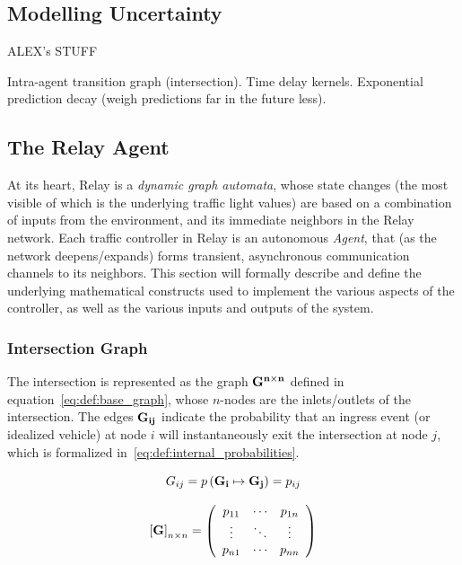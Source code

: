 \documentclass{report}
\begin{document}
\subsection{Modelling Uncertainty}
\label{sec:modelling_uncertainty}

ALEX's STUFF

Intra-agent transition graph (intersection).
Time delay kernels.
Exponential prediction decay (weigh predictions far in the future less).


\subsection{The Relay Agent}
\label{sec:def:agent}

At its heart, Relay is a \emph{dynamic graph automata}, whose state changes (the most visible of which is the underlying traffic light values) are based on a combination of inputs from the environment, and its immediate neighbors in the Relay network.
Each traffic controller in Relay is an autonomous \emph{Agent}, that (as the network deepens/expands) forms transient, asynchronous communication channels to its neighbors.
This section will formally describe and define the underlying mathematical constructs used to implement the various aspects of the controller, as well as the various inputs and outputs of the system.


\subsubsection{Intersection Graph}
\label{sec:def:intersection_graph}

The intersection is represented as the graph $\bf{G}^{n \times n}$ defined in equation~\eqref{eq:def:base_graph}, whose $n$-nodes are the inlets/outlets of the intersection.
The edges $\bf{G}_{ij}$ indicate the probability that an ingress event (or idealized vehicle) at node $i$ will instantaneously exit the intersection at node $j$, which is formalized in~\eqref{eq:def:internal_probabilities}.

\begin{equation}\label{eq:def:internal_probabilities}
	G_{ij} = p\left(\bf{G}_i \mapsto \bf{G}_j \right) = p_{ij}
\end{equation}

\begin{equation}\label{eq:def:base_graph}
	\left[\bf{G}\right]_{n \times n} =
	\left(
		\begin{array}{ccc}
			p_{11} & \cdots & p_{1n} \\
			\vdots & \ddots & \vdots \\
			p_{n1} & \cdots & p_{nn}
		\end{array}
	\right)
\end{equation}
\end{document}
